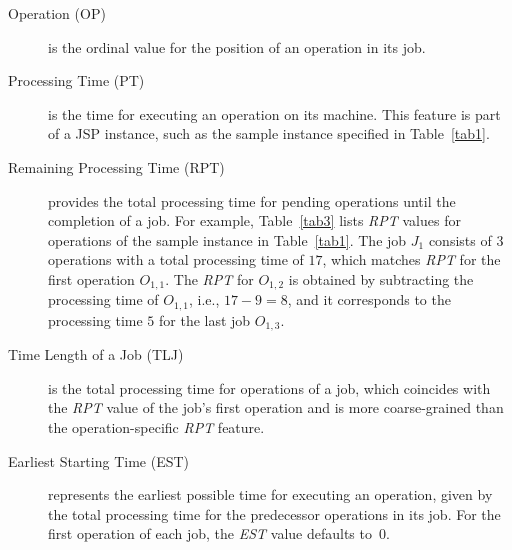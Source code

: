 \documentclass[runningheads]{llncs}
\begin{document}
\begin{description}
  \item[Operation (OP)] is the ordinal value for the position of an operation in its job.

  \item[Processing Time (PT)] is the time for executing an operation on its machine. This feature is part of a JSP instance, such as the sample instance specified in Table~\ref{tab1}.
  
  \item[Remaining Processing Time (RPT)] provides the total processing time for pending operations until the completion of a job. For example, Table~\ref{tab3} lists \textit{RPT} values for operations of the sample instance in Table~\ref{tab1}. The job $J_1$ consists of $3$ operations with a total processing time of $17$, which matches \textit{RPT} for the first operation $O_{1,1}$. %
  The \textit{RPT} for $O_{1,2}$ is obtained by subtracting the processing time of $O_{1,1}$, i.e., $17-9=8$, and it corresponds to the processing time $5$ for the last job $O_{1,3}$.
  
  \item[Time Length of a Job (TLJ)] is the total processing time for operations of a job, which coincides with the \textit{RPT} value of the job's first operation and is more coarse-grained than the operation-specific \textit{RPT} feature.
  
  \item[Earliest Starting Time (EST)] represents the earliest possible time for executing an operation, given by the total processing time for the predecessor operations in its job. %
  For the first operation of each job, the \textit{EST} value defaults to~$0$.
  

\end{description}
\end{document}
